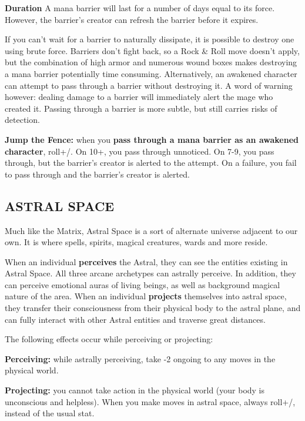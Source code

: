 \documentclass[oneside,10pt]{article}
\begin{document}
\begin{multicols}{2}
\begin{dent}
  \textbf{Duration} A mana barrier will last for a number of days
  equal to its force. However, the barrier's creator can refresh the
  barrier before it expires.

\end{dent}

If you can't wait for a barrier to naturally dissipate, it is possible
to destroy one using brute force. Barriers don't fight back, so a Rock
\& Roll move doesn't apply, but the combination of high armor and
numerous wound boxes makes destroying a mana barrier potentially time
consuming. Alternatively, an awakened character can attempt to pass
through a barrier without destroying it. A word of warning however:
dealing damage to a barrier will immediately alert the mage who
created it. Passing through a barrier is more subtle, but still
carries risks of detection.

\textbf{Jump the Fence:} when you \textbf{pass through a mana barrier
  as an awakened character}, roll+\oomph/. On 10+, you pass through
unnoticed.  On 7-9, you pass through, but the barrier's creator is
alerted to the attempt. On a failure, you fail to pass through and the
barrier's creator is alerted.

\subsection{ASTRAL SPACE}
Much like the Matrix, Astral Space is a sort of alternate universe
adjacent to our own. It is where spells, spirits, magical creatures,
wards and more reside.

When an individual \textbf{perceives} the Astral, they can see the
entities existing in Astral Space. All three arcane archetypes can
astrally perceive. In addition, they can perceive emotional auras of
living beings, as well as background magical nature of the area. When
an individual \textbf{projects} themselves into astral space, they
transfer their consciousness from their physical body to the astral
plane, and can fully interact with other Astral entities and traverse
great distances.

The following effects occur while perceiving or projecting:
\begin{dent}
  \textbf{Perceiving:} while astrally perceiving, take -2 ongoing to
  any moves in the physical world.

  \textbf{Projecting:} you cannot take action in the physical world
  (your body is unconscious and helpless). When you make moves in
  astral space, always roll+\mastery/, instead of the usual stat.
\end{dent}


\end{multicols}
\end{document}

